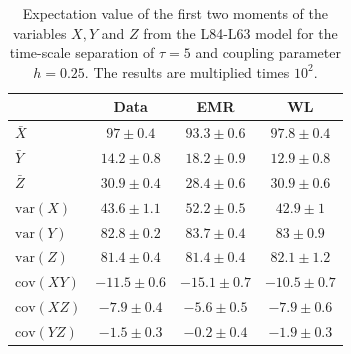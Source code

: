 \documentclass[12pt]{article}
\begin{document}
\begin{table}[H]
	\centering
	\begin{tabular}{l | ccc}
		& Data & EMR  & WL \\ 
		\hline 
		$\bar{X}$&$97 \pm 0.4$ & $93.3 \pm 0.6 $& $97.8 \pm 0.4$ \\ 
		$\bar{Y}$&$14.2 \pm 0.8$ &$ 18.2 \pm 0.9$ &$ 12.9 \pm 0.8$ \\ 
		$\bar{Z}$&$30.9 \pm 0.4 $ &$ 28.4 \pm 0.6$ &$ 30.9 \pm 0.6$ \\ 
		$\mathrm{var}(X)$&$43.6 \pm 1.1$ &$ 52.2 \pm 0.5$ &$ 42.9 \pm 1$ \\ 
		$\mathrm{var}(Y)$&$82.8 \pm 0.2$ &$ 83.7 \pm 0.4 $& $83 \pm 0.9$ \\ 
		$\mathrm{var}(Z)$&$81.4 \pm 0.4 $& $81.4 \pm 0.4 $&$ 82.1 \pm 1.2 $\\ 
		$\mathrm{cov}(XY)$&$-11.5 \pm 0.6$ & $-15.1 \pm 0.7$ & $-10.5 \pm 0.7 $\\ 
		$\mathrm{cov}(XZ)$&$-7.9 \pm 0.4$ &$ -5.6 \pm 0.5$ &$ -7.9 \pm 0.6 $\\ 
		$\mathrm{cov}(YZ)$&$-1.5 \pm 0.3 $&$ -0.2 \pm 0.4 $& $-1.9 \pm 0.3 $\\ 
	\end{tabular}
	\caption{\label{tablemoments2}Expectation value of the first two moments of the variables $X,Y$ and $Z$ from the L84-L63 model for the time-scale separation of $\tau = 5$ and coupling parameter $h=0.25$. The results are multiplied times $10^2$.}
\end{table}
\end{document}
